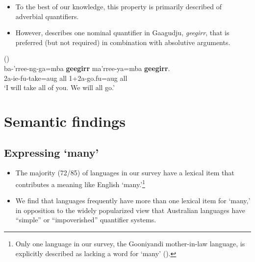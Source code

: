 \documentclass{article}
\makeatletter
\newcommand{\ofy}{/85} %
\makeatother
\begin{document}
\begin{itemize}
\item To the best of our knowledge, this property is primarily described of adverbial quantifiers. \item However, \cite{harvey92} describes one nominal quantifier in Gaagudju, {\it geegirr}, that is preferred (but not required) in combination with absolutive arguments.
\end{itemize}

\begin{exe}
   (\citealt[307]{harvey92})\\
  \gll ba-'rree-ng-ga=mba \textbf{geegirr} ma'rree-ya=mba \textbf{geegirr}.\\ 
  2{\sc a-ie-fu}-take={\sc aug} all 1+2{\sc a}-go.{\sc fu=aug} all\\
  \glt `I will take all of you. We will all go.'
\end{exe}


\section{Semantic findings}
\label{sec:semfind}

\subsection{Expressing `many'}

\begin{itemize}
\item The majority (72\ofy) of languages in our survey have a lexical item that  contributes a meaning like English `many.'\footnote{Only one language in our survey, the Gooniyandi mother-in-law language, is explicitly described as lacking a word for `many' (\citealt[636]{mcgregor89}).}
\item We find that languages frequently have more than one lexical item for `many,' in opposition to the widely popularized view that Australian languages have ``simple'' or ``impoverished'' quantifier systems.
\end{itemize}
\end{document}
